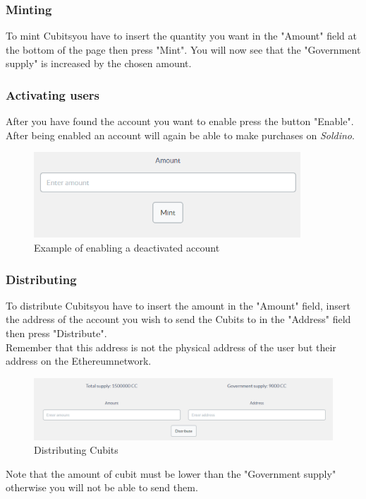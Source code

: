 		\subsubsection{Minting}
		To mint Cubits\glosp you have to insert the quantity you want in the 
		"Amount" field at the bottom of the page then press "Mint". You will 
		now see that the "Government supply" is increased by the chosen amount.
		\subsubsection{Activating users}
		After you have found the account you want to enable press the button 
		"Enable". After being enabled an account will again be able to make 
		purchases on \textit{Soldino}.
		\begin{figure}[H]
			\includegraphics[width=10cm]{res/images/minting_cubits.png}
			\centering
			\caption{Example of enabling a deactivated account}
		\end{figure}
		\subsubsection{Distributing}
		To distribute Cubits\glosp you have to insert the amount in the "Amount" 
		field, insert the address of the account you wish to send the Cubits to 
		in the "Address" field then press "Distribute".\\
		Remember that this address is not the physical address of the user but 
		their address on the Ethereum\glosp network.
		\begin{figure}[H]
			\includegraphics[width=15cm]{res/images/distribute_cubit.png}
			\centering
			\caption{Distributing Cubits}
		\end{figure}
		Note that the amount of cubit must be lower than the "Government  
		supply" otherwise you will not be able to send them.
